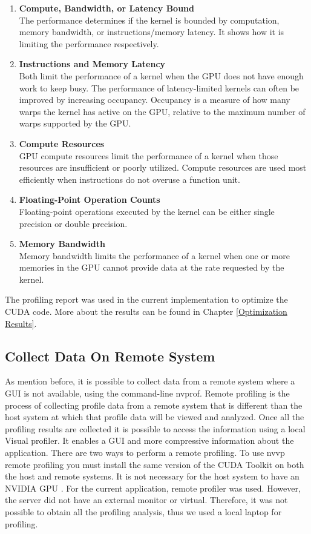 \begin{enumerate}
  \item \textbf{Compute, Bandwidth, or Latency Bound} \hfill \\
      The performance determines if the kernel is bounded by computation, memory bandwidth, or instructions/memory latency. It shows how it is limiting the performance respectively.
  
  \item \textbf{Instructions and Memory Latency} \hfill \\
Both limit the performance of a kernel when the GPU does not have enough work to keep busy. The performance of latency-limited kernels can often be improved by increasing occupancy. Occupancy is a measure of how many warps the kernel has active on the GPU, relative to the maximum number of warps supported by the GPU.
  
  \item \textbf{Compute Resources} \hfill \\
GPU compute resources limit the performance of a kernel when those resources are insufficient or poorly utilized. Compute resources are used most efficiently when instructions do not overuse a function unit. 
  \item \textbf{Floating-Point Operation Counts} \hfill \\
  Floating-point operations executed by the kernel can be either single precision or double precision.
  
  \item \textbf{Memory Bandwidth} \hfill \\
  Memory bandwidth limits the performance of a kernel when one or more memories in the GPU cannot provide data at the rate requested by the kernel.
\end{enumerate}

The profiling report was used in the current implementation to optimize the CUDA code. More about the results can be found in Chapter \ref{Optimization Results}.

\subsection{Collect Data On Remote System}

As mention before, it is possible to collect data from a remote system where a GUI is not available, using the command-line nvprof. Remote profiling is the process of collecting profile data from a remote system that is different than the host system at which that profile data will be viewed and analyzed. Once all the profiling results are collected it is possible to access the information using a local Visual profiler. It enables a GUI and more compressive information about the application. There are two ways to perform a remote profiling. To use nvvp remote profiling you must install the same version of the CUDA Toolkit on both the host and remote systems. It is not necessary for the host system to have an NVIDIA GPU \cite{tool}. For the current application, remote profiler was used. However, the server did not have an external monitor or virtual. Therefore, it was not possible to obtain all the profiling analysis, thus we used a local laptop for profiling.

